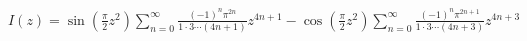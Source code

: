 $ I(z) = \sin( \frac{\pi}{2} z^2 ) \sum_{n=0}^\infty
    \frac{ (-1)^n \pi^{2n} }{1 \cdot 3 
    \cdots (4n + 1) } z^{4n + 1}
    -\cos( \frac{\pi}{2} z^2 ) \sum_{n=0}^\infty
    \frac{ (-1)^n \pi^{2n + 1} }{1 \cdot 3 
    \cdots (4n + 3) } z^{4n + 3} $

